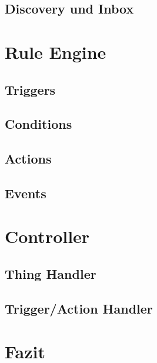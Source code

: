 \subsection{Discovery und Inbox}

\section{Rule Engine}
\subsection{Triggers}
\subsection{Conditions}
\subsection{Actions}
\subsection{Events}

\section{Controller}
\subsection{Thing Handler}
\subsection{Trigger/Action Handler}

\section{Fazit}
